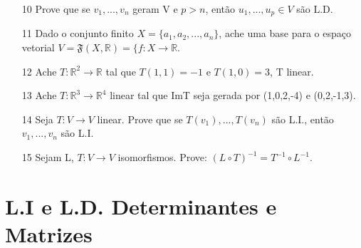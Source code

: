 \documentclass[11pt]{article}
\begin{document}
\begin{itemize}
\item[10] Prove que se $v_1,...,v_n$ geram V e $p>n$, então $u_1,...,u_p\in V$ são L.D.

\item[11] Dado o conjunto finito $X=\{a_1,a_2,...,a_n\}$, ache uma base para o espaço vetorial $V=\mathfrak{F}(X,\mathbb{R})=\{f:X\longrightarrow \mathbb{R}$.

\item[12] Ache $T:\mathbb{R}^2\longrightarrow \mathbb{R}$ tal que $T(1,1)=-1$ e $T(1,0)=3$, T linear.

\item[13] Ache $T:\mathbb{R}^3\longrightarrow \mathbb{R}^4$ linear tal que ImT seja gerada por (1,0,2,-4) e (0,2,-1,3).

\item[14] Seja $T:V\longrightarrow V$ linear. Prove que se $T(v_1),...,T(v_n)$ são L.I., então $v_1,...,v_n$ são L.I.

\item[15] Sejam L, $T:V\longrightarrow V$ isomorfismos. Prove: $(L\circ T)^{-1}=T^{-1}\circ L^{-1}$.
\end{itemize}

\section*{L.I e L.D. Determinantes e Matrizes}
\end{document}
